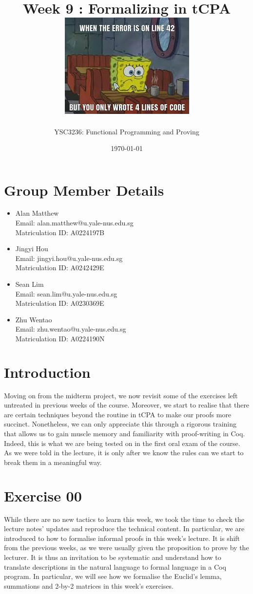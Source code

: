 \documentclass{article}
\title{
    \fontfamily{ebgaramond}\selectfont Week 9 : Formalizing in tCPA \\
    \vspace{1cm}
    \includegraphics[width=0.8\linewidth]{download.jpeg}
}
\author{YSC3236: Functional Programming and Proving}
\date{%
    \vspace{1cm}
    \today
}
\begin{document}
\maketitle

\newpage
\section*{Group Member Details}
\begin{itemize}
    \item Alan Matthew \\
    Email: alan.matthew@u.yale-nus.edu.sg \\
    Matriculation ID: A0224197B

    \item Jingyi Hou \\
    Email: jingyi.hou@u.yale-nus.edu.sg \\
    Matriculation ID: A0242429E

    \item Sean Lim \\
    Email: sean.lim@u.yale-nus.edu.sg \\
    Matriculation ID: A0230369E

    \item Zhu Wentao \\
    Email: zhu.wentao@u.yale-nus.edu.sg \\
    Matriculation ID: A0224190N
\end{itemize}
\newpage
\tableofcontents
\newpage

\section{Introduction}
Moving on from the midterm project, we now revisit some of the exercises left untreated in previous weeks of the course. Moreover, we start to realise that there are certain techniques beyond the routine in tCPA to make our proofs more succinct. Nonetheless, we can only appreciate this through a rigorous training that allows us to gain muscle memory and familiarity with proof-writing in Coq. Indeed, this is what we are being tested on in the first oral exam of the course. As we were told in the lecture, it is only after we know the rules can we start to break them in a meaningful way.

\section{Exercise 00}
While there are no new tactics to learn this week, we took the time to check the lecture notes' updates and reproduce the technical content. In particular, we are introduced to how to formalise informal proofs in this week's lecture. It is shift from the previous weeks, as we were usually given the proposition to prove by the lecturer. It is thus an invitation to be systematic and understand how to translate descriptions in the natural language to formal language in a Coq program. In particular, we will see how we formalise the Euclid's lemma, summations and 2-by-2 matrices in this week's exercises. 
\end{document}
